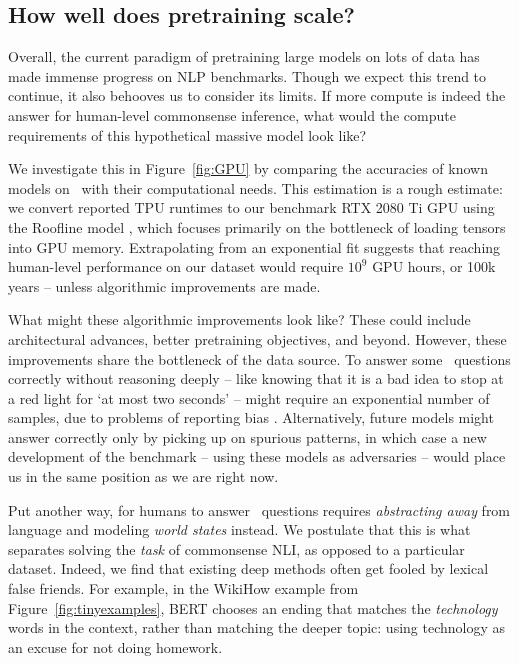 \subsection{How well does pretraining scale?}

Overall, the current paradigm of pretraining large models on lots of data has made immense progress on NLP benchmarks. Though we expect this trend to continue, it also behooves us to consider its limits. If more compute is indeed the answer for human-level commonsense inference, what would the compute requirements of this hypothetical massive model look like?

We investigate this in Figure~\ref{fig:GPU} by comparing the accuracies of known models on {}~with their computational needs. This estimation is a rough estimate: we convert reported TPU runtimes to our benchmark RTX 2080 Ti GPU using the Roofline model \cite{williams2009roofline}, which focuses primarily on the bottleneck of loading tensors into GPU memory. Extrapolating from an exponential fit suggests that reaching human-level performance on our dataset would require $10^9$ GPU hours, or 100k years -- unless algorithmic improvements are made.

What might these algorithmic improvements look like? These could include architectural advances, better pretraining objectives, and beyond. However, these improvements share the bottleneck of the data source. To answer some {}~questions correctly without reasoning deeply -- like knowing that it is a bad idea to stop at a red light for `at most two seconds' -- might require an exponential number of samples, due to problems of reporting bias \cite{gordon2013reporting}. Alternatively, future models might answer correctly only by picking up on spurious patterns, in which case a new development of the benchmark -- using these models as adversaries -- would place us in the same position as we are right now.

Put another way, for humans to answer {}~questions requires \emph{abstracting away} from language and modeling \emph{world states} instead. We postulate that this is what separates solving the \emph{task} of commonsense NLI, as opposed to a particular dataset. Indeed, we find that existing deep methods often get fooled by lexical false friends. For example, in the WikiHow example from Figure~\ref{fig:tinyexamples}, BERT chooses an ending that matches the \emph{technology} words in the context, rather than matching the deeper topic: using technology as an excuse for not doing homework. 

